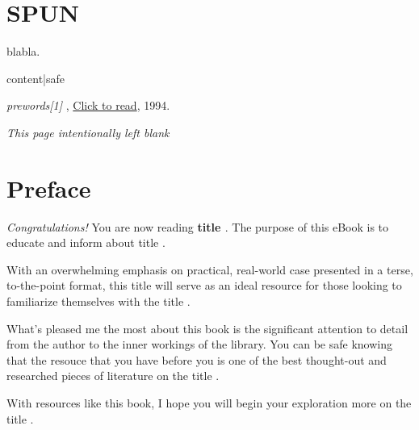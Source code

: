 \documentclass{article}
\begin{document}
\section*{SPUN}

{\normalsize
  blabla.\cite{satu}

  {{ content|safe }} 
}

\clearpage

\begin{thebibliography}{99}

\emph{
{{ prewords[1] }}}, \href{http://www.google.com}{Click to read}, 1994.

\end{thebibliography}

\clearpage

\noindent
\begin{center}
{\normalsize \emph{This page intentionally left blank}}
\end{center}

\clearpage

\section*{Preface}
{\normalsize
\begin{flushleft}
\emph{Congratulations!} You are now reading \textbf{ {{ title }} }. The
purpose of this eBook is to educate and inform about {{ title }}.
\end{flushleft}

\begin{flushleft}
With an overwhelming emphasis on practical, real-world case presented
in a terse, to-the-point format, this {{ title }} will serve as an
ideal resource for those looking to familiarize themselves with the 
{{ title }}.
\end{flushleft}

\begin{flushleft}
What's pleased me the most about this book is the significant
attention to detail from the author to the inner workings of the
library. You can be safe knowing that the resouce that you have before
you is one of the best thought-out and researched pieces of literature
on the {{ title }}.
\end{flushleft}

\begin{flushleft}
With resources like this book, I hope you will begin your exploration
more on the {{ title }}.
\end{flushleft}
}
\end{document}
